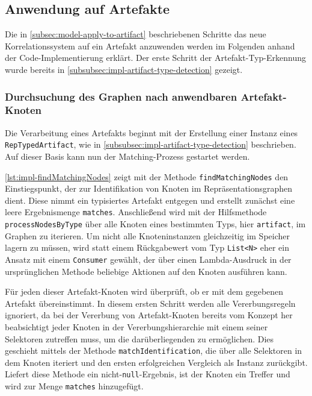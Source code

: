 \subsection{Anwendung auf Artefakte}\label{subsec:impl-apply-to-artifacts}

Die in \autoref{subsec:model-apply-to-artifact} beschriebenen Schritte das neue Korrelationssystem auf ein Artefakt anzuwenden werden im Folgenden anhand der Code-Implementierung erklärt.
Der erste Schritt der Artefakt-Typ-Erkennung wurde bereits in \autoref{subsubsec:impl-artifact-type-detection} gezeigt.

\subsubsection{Durchsuchung des Graphen nach anwendbaren Artefakt-Knoten}

Die Verarbeitung eines Artefakts beginnt mit der Erstellung einer Instanz eines \texttt{RepTypedArtifact}, wie in \autoref{subsubsec:impl-artifact-type-detection} beschrieben.
Auf dieser Basis kann nun der Matching-Prozess gestartet werden.

\autoref{lst:impl-findMatchingNodes} zeigt mit der Methode \texttt{findMatchingNodes} den Einstiegspunkt, der zur Identifikation von Knoten im Repräsentationsgraphen dient.
Diese nimmt ein typisiertes Artefakt entgegen und erstellt zunächst eine leere Ergebnismenge \texttt{matches}.
Anschließend wird mit der Hilfsmethode \texttt{processNodesByType} über alle Knoten eines bestimmten Typs, hier \texttt{artifact}, im Graphen zu iterieren.
Um nicht alle Knoteninstanzen gleichzeitig im Speicher lagern zu müssen, wird statt einem Rückgabewert vom Typ \texttt{List<N>} eher ein Ansatz mit einem \texttt{Consumer} gewählt, der über einen Lambda-Ausdruck in der ursprünglichen Methode beliebige Aktionen auf den Knoten ausführen kann.

Für jeden dieser Artefakt-Knoten wird überprüft, ob er mit dem gegebenen Artefakt übereinstimmt.
In diesem ersten Schritt werden alle Vererbungsregeln ignoriert, da bei der Vererbung von Artefakt-Knoten bereits vom Konzept her beabsichtigt jeder Knoten in der Vererbungshierarchie mit einem seiner Selektoren zutreffen muss, um die darüberliegenden zu ermöglichen.
Dies geschieht mittels der Methode \texttt{matchIdentification}, die über alle Selektoren in dem Knoten iteriert und den ersten erfolgreichen Vergleich als Instanz zurückgibt.
Liefert diese Methode ein nicht-\texttt{null}-Ergebnis, ist der Knoten ein Treffer und wird zur Menge \texttt{matches} hinzugefügt.

